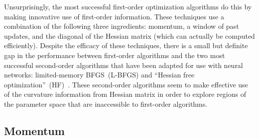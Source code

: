 \documentclass[11pt,a4paper]{article}
\numberwithin{equation}{section}
\begin{document}
Unsurprisingly, the most successful first-order optimization algorithms do this
by making innovative use of first-order information. These techniques use a
combination of the following three ingredients: momentum, a window of past
updates, and the diagonal of the Hessian matrix (which can actually be computed
efficiently). Despite the efficacy of these techniques, there is a small but
definite gap in the performance between first-order algorithms and the two most
successful second-order algorithms that have been adapted for use with neural
networks: limited-memory BFGS~(L-BFGS) and ``Hessian free
optimization''~(HF)~\citep{martens2010deep, ngiam2011optimization,
sutskever2013importance}. These second-order algorithms seem to make effective
use of the curvature information from Hessian matrix in order to explore regions
of the parameter space that are inaccessible to first-order algorithms.

\subsection{Momentum}
\end{document}
